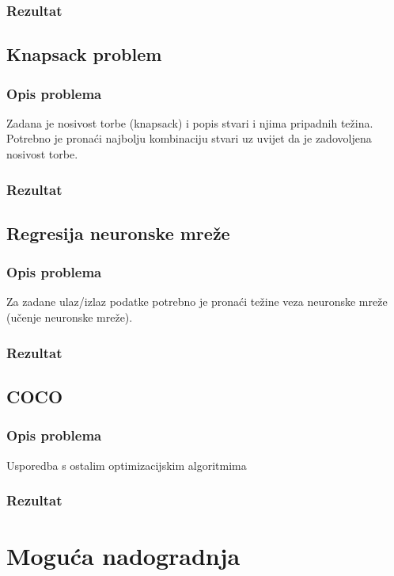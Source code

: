 \documentclass[times, utf8, zavrsni]{fer}
\begin{document}
\subsection{Rezultat}

\section{Knapsack problem}
\subsection{Opis problema}
Zadana je nosivost torbe (knapsack) i popis stvari i njima pripadnih težina.
Potrebno je pronaći najbolju kombinaciju stvari uz uvijet da je zadovoljena nosivost torbe.

\subsection{Rezultat}

\section{Regresija neuronske mreže}
\subsection{Opis problema}
Za zadane ulaz/izlaz podatke potrebno je pronaći težine veza neuronske mreže (učenje neuronske mreže).

\subsection{Rezultat}

\section{COCO}
\subsection{Opis problema}
Usporedba s ostalim optimizacijskim algoritmima

\subsection{Rezultat}



\chapter{Moguća nadogradnja}
\end{document}
